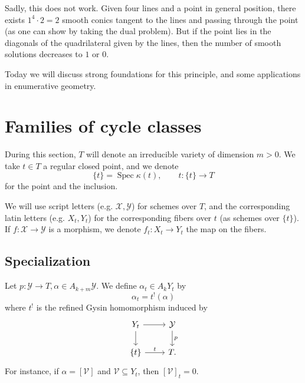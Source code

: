 \documentclass[leqno, openany]{memoir}
\theoremstyle{definition}
\theoremstyle{remark}
\theoremstyle{plain}
\theoremstyle{definition}
\theoremstyle{remark}
\newcommand{\mc}[1]{\mathcal{#1}}
\DeclareMathOperator{\Spec}{Spec}
\begin{document}
Sadly, this does not work. Given four lines and a point in general position, there exists $1^4 \cdot 2=2$ smooth conics tangent to the lines and passing through the point (as one can show by taking the dual problem). But if the point lies in the diagonals of the quadrilateral given by the lines, then the number of smooth solutions decreases to $1$ or $0$. 

Today we will discuss strong foundations for this principle, and some applications in enumerative geometry. 

\section{Families of cycle classes}

During this section, $T$ will denote an irreducible variety of dimension $m>0$. We take $t \in T$ a regular closed point, and we denote
\[ \{t\}=\Spec \kappa(t), \qquad t\colon \{t\} \to T \] 
for the point and the inclusion.

We will use script letters (e.g. $\mc{X}, \mc{Y}$) for schemes over $T$, and the corresponding latin letters (e.g. $X_t, Y_t$) for the corresponding fibers over $t$ (as schemes over $\{t\}$). If $f\colon \mc{X} \to \mc{Y}$ is a morphism, we denote $f_t\colon X_t \to Y_t$ the map on the fibers.

\subsection{Specialization}%
\label{sub:specialization}


Let $p\colon \mc{Y} \to T, \alpha \in A_{k+m}\mc{Y}$. We define $\alpha_t \in A_k Y_t$ by
\[ \alpha_t = t^!(\alpha) \]
where $t^{!}$ is the refined Gysin homomorphism induced by
\[ \begin{tikzcd} Y_t \arrow[r] \arrow[d] & \mc{Y} \arrow[d, "p"] \\ {\{t\}} \arrow[r, "t"] & T. \end{tikzcd} \]
For instance, if $\alpha=[\mc{V}]$ and $\mc{V} \subseteq Y_t$, then ${[\mc{V}]}_t=0$. 
\end{document}
